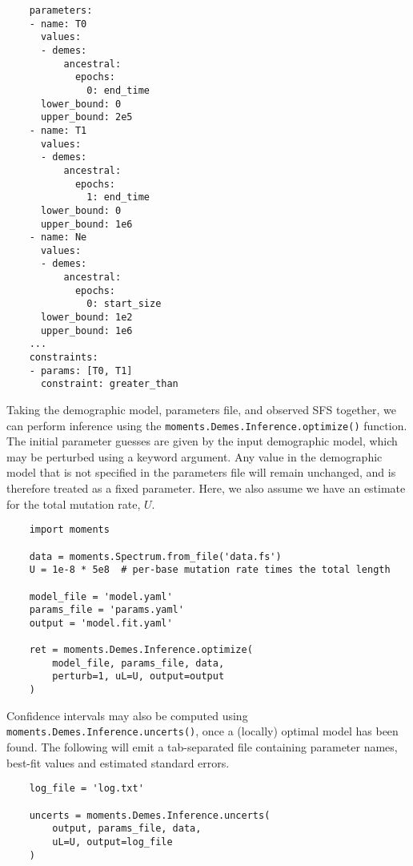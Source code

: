 \documentclass[]{article}
\begin{document}
\singlespacing
\begin{verbatim}
    parameters:
    - name: T0
      values:
      - demes:
          ancestral:
            epochs:
              0: end_time
      lower_bound: 0
      upper_bound: 2e5
    - name: T1
      values:
      - demes:
          ancestral:
            epochs:
              1: end_time
      lower_bound: 0
      upper_bound: 1e6
    - name: Ne
      values:
      - demes:
          ancestral:
            epochs:
              0: start_size
      lower_bound: 1e2
      upper_bound: 1e6
    ...
    constraints:
    - params: [T0, T1]
      constraint: greater_than
\end{verbatim}
\doublespacing

Taking the demographic model, parameters file, and observed SFS together, we
can perform inference using the \texttt{moments.Demes.Inference.optimize()}
function. The initial parameter guesses are given by the input demographic
model, which may be perturbed using a keyword argument. Any value in the
demographic model that is not specified in the parameters file will remain
unchanged, and is therefore treated as a fixed parameter. Here, we also assume
we have an estimate for the total mutation rate, $U$.

\singlespacing
\begin{verbatim}
    import moments 

    data = moments.Spectrum.from_file('data.fs')
    U = 1e-8 * 5e8  # per-base mutation rate times the total length

    model_file = 'model.yaml'
    params_file = 'params.yaml'
    output = 'model.fit.yaml'

    ret = moments.Demes.Inference.optimize(
        model_file, params_file, data,
        perturb=1, uL=U, output=output
    )
\end{verbatim}
\doublespacing

Confidence intervals may also be computed using
\texttt{moments.Demes.Inference.uncerts()}, once a (locally) optimal model has
been found. The following will emit a tab-separated file containing parameter
names, best-fit values and estimated standard errors.

\singlespacing
\begin{verbatim}
    log_file = 'log.txt'

    uncerts = moments.Demes.Inference.uncerts(
        output, params_file, data,
        uL=U, output=log_file
    )
\end{verbatim}
\doublespacing
\end{document}

